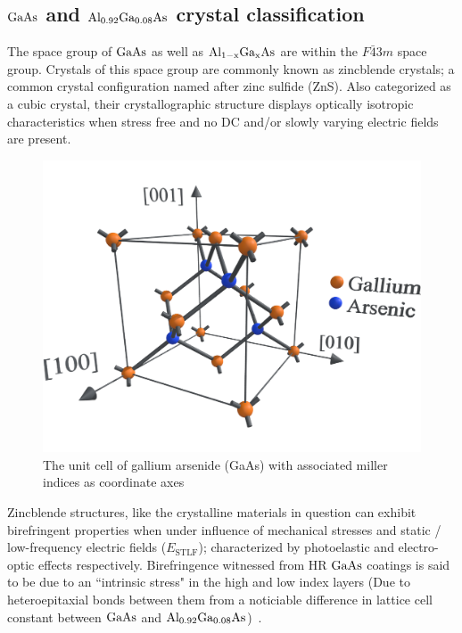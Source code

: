 \subsection{\texorpdfstring{$\mathrm{GaAs}$}{gaas} and \texorpdfstring{$\mathrm{Al_{0.92}Ga_{0.08}As}$}{algaas} crystal classification}
The space group of $\mathrm{GaAs}$ as well as $\mathrm{Al_{1-x}Ga_{x}As}$ are within the $F\bar{4}3m$ space group. Crystals of this space group are commonly known as zincblende crystals; a common crystal configuration named after zinc sulfide (ZnS). Also categorized as a cubic crystal, their crystallographic structure displays optically isotropic characteristics when stress free and no DC and/or slowly varying electric fields are present. 

\begin{figure}[!ht]
\begin{center}
\includegraphics[width=.5\textwidth]{figs/ALGAAS/gaas_unit_cell_mi.pdf}
\caption{The unit cell of gallium arsenide (GaAs) with associated miller indices as coordinate axes}
\end{center}
\label{fig:gaasuc}
\end{figure}

Zincblende structures, like the crystalline materials in question can exhibit birefringent properties when under influence of mechanical stresses and static / low-frequency electric fields ($E_\mathrm{STLF}$); characterized by photoelastic and electro-optic effects respectively. Birefringence witnessed from HR $\mathrm{GaAs}$ coatings is said to be due to an ``intrinsic stress" in the high and low index layers (Due to heteroepitaxial bonds between them from a noticiable difference in lattice cell constant between $\mathrm{GaAs}$ and $\mathrm{Al_{0.92}Ga_{0.08}As}$)~\cite{adachi:1985}.

